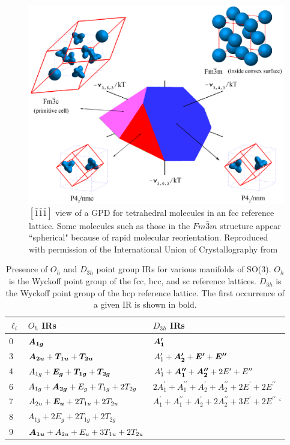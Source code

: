 \documentclass[preprint]{iucr}              %
\newcommand{\mb}[1]{\ensuremath{\mbox{\boldmath $ #1 $}}}
\begin{document}
\pagebreak

\begin{figure}
\caption{$[\bar{1}\bar{1}\bar{1}]$ view of a GPD for tetrahedral molecules in
an fcc reference lattice. Some molecules such as
those in the $Fm\bar{3}m$ structure appear ``spherical" because of rapid molecular
reorientation. Reproduced with permission of the International
Union of Crystallography from \cite{Mettes04}} \label{gpd2}
\includegraphics{figure1bII.eps}
\end{figure}

\pagebreak

\begin{table}%
\caption{Presence of $O_h$ and $D_{3h}$ point group IRs for various
manifolds of SO(3). $O_h$ is the Wyckoff point group of the fcc,
bcc, and sc reference lattices. $D_{3h}$ is the Wyckoff point group
of the hcp reference lattice. The first occurrence of a given IR is
shown in bold.}\label{wyckoff_IRs}\small
\begin{tabular}{lll}\hline
$\ell_i$ & $O_h$ IRs &  $D_{3h}$ IRs \\
\hline
0 & $\mb{A_{1g}}$ & $\mb{A^\prime_1}$ \\
3 & $\mb{A_{2u}}+\mb{T_{1u}}+\mb{T_{2u}}$ &
$A^\prime_1+\mb{A^{\prime}_2}+\mb{E^\prime}+\mb{E^{\prime\prime}}$ \\
4 & $A_{1g}+\mb{E_{g}}+\mb{T_{1g}}+\mb{T_{2g}}$ &
$A^\prime_1+\mb{A^{\prime\prime}_1}+\mb{A^{\prime\prime}_2}+2E^\prime+E^{
\prime\prime}$\\
6 & $A_{1g}+\mb{A_{2g}}+E_g+T_{1g}+2T_{2g}$ &
$2A^\prime_1+A^{\prime\prime}_1+A^{\prime}_2+A^{\prime\prime}_2+2E^\prime+2E^{
\prime\prime}$ \\
7 & $A_{2u}+\mb{E_u}+2T_{1u}+2T_{2u}$ &
$A^\prime_1+A^{\prime\prime}_1+A^{\prime}_2+2A^{\prime\prime}_2+3E^\prime+2E^{
\prime\prime}$ `\\
8 & $A_{1g}+2E_g+2T_{1g}+2T_{2g}$ & \\
9 & $\mb{A_{1u}}+A_{2u}+E_u+3T_{1u}+2T_{2u}$ & \\
\hline
\end{tabular}
\end{table}
\end{document}
